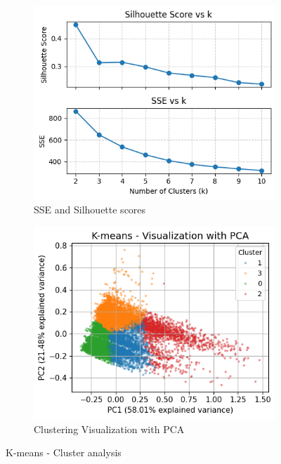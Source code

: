 \begin{figure}[H]
    \centering
    \begin{subfigure}[b]{0.44\textwidth}
        \centering
        \includegraphics[width=\textwidth]{plots/sse_silh_kmeans_def.png}
        \caption{SSE and Silhouette scores}
        \label{fig:sse_silh_kmeans}
    \end{subfigure}
    \begin{subfigure}[b]{0.44\textwidth}
        \centering
        \includegraphics[width=\textwidth]{plots/kmeans_clusters.png}
        \caption{Clustering Visualization with PCA}
        \label{fig:kmeans_visualization}
    \end{subfigure}
    \caption{K-means - Cluster analysis}
    \label{fig:subplots_kmeans}
\end{figure}
